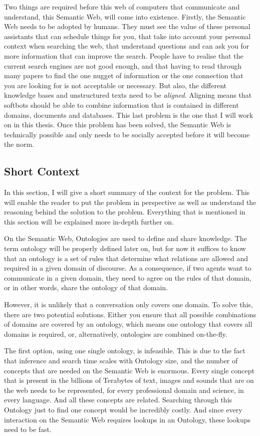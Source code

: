 \documentclass{article}
\begin{document}
 Two things are required before this web of computers that communicate and understand, this Semantic Web, will come into existence. 
 Firstly, the Semantic Web needs to be adopted by humans. They must see the value of these personal assistants that can schedule things for you, that take into account your personal context when searching the web, that understand questions and can ask you for more information that can improve the search. People have to realise that the current search engines are not good enough, and that having to read through many papers to find the one nugget of information or the one connection that you are looking for is not acceptable or necessary.
 But also, the different knowledge bases and unstructured texts need to be \emph{aligned}. Aligning means that softbots should be able to combine information that is contained in different domains, documents and databases. This last problem is the one that I will work on in this thesis. Once this problem has been solved, the Semantic Web is technically possible and only needs to be socially accepted before it will become the norm.

 \subsection{Short Context}
 In this section, I will give a short summary of the context for the problem. This will enable the reader to put the problem in perspective as well as understand the reasoning behind the solution to the problem. Everything that is mentioned in this section will be explained more in-depth further on.
 
 On the Semantic Web, Ontologies are used to define and share knowledge. The term ontology will be properly defined later on, but for now it suffices to know that an ontology is a set of rules that determine what relations are allowed and required in a given domain of discourse. As a consequence, if two agents want to communicate in a given domain, they need to agree on the rules of that domain, or in other words, share the ontology of that domain.
 
 However, it is unlikely that a conversation only covers one domain. To solve this, there are two potential solutions. Either you ensure that all possible combinations of domains are covered by an ontology, which means one ontology that covers all domains is required, or, alternatively, ontologies are combined on-the-fly.
 
 The first option, using one single ontology, is infeasible. This is due to the fact that inference and search time scales with Ontology size, and the number of concepts that are needed on the Semantic Web is enormous. Every single concept that is present in the billions of Terabytes of text, images and sounds that are on the web needs to be represented, for every professional domain and science, in every language. And all these concepts are related. Searching through this Ontology just to find one concept would be incredibly costly. And since every interaction on the Semantic Web requires lookups in an Ontology, these lookups need to be fast.
 
\end{document}
